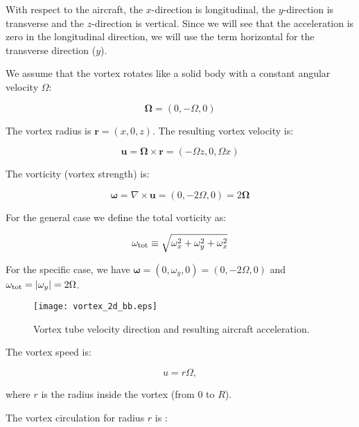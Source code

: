 \documentclass[smallextended]{svjour3}       %
\begin{document}
With respect to the aircraft, the $x$-direction is longitudinal, the $y$-direction is transverse and the $z$-direction is vertical. Since we will see that the acceleration is zero in the longitudinal direction, we will use the term horizontal for the transverse direction ($y$).

We assume that the vortex rotates like a solid body with a constant angular velocity $\Omega$:

\begin{equation}
\boldsymbol\Omega=\left( 0,-\Omega,0\right)
\end{equation}

The vortex radius is $\boldsymbol r=\left( x,0,z\right)$. The resulting vortex velocity is:

\begin{equation}
\boldsymbol u=\boldsymbol\Omega \times \boldsymbol r=\left(-\Omega z,0,\Omega x\right)
\end{equation}

The vorticity (vortex strength) is:

\begin{equation}
\boldsymbol\omega=\nabla \times \boldsymbol u=\left( 0,-2\Omega,0\right)=2 \boldsymbol\Omega
\end{equation}

For the general case we define the total vorticity as:

\begin{equation}
\omega_{\rm tot} \equiv \sqrt{\omega_x^2 + \omega_y^2 + \omega_x^2}
\end{equation}

For the specific case, we have $\boldsymbol\omega=\left(0,\omega_y,0 \right)=\left( 0,-2\Omega,0\right)$ and $\omega_{\rm tot}=|\omega_y|=2\Omega$.

\begin{figure}
\texttt{[image: vortex\_2d\_bb.eps]}
\caption{Vortex tube velocity direction and resulting aircraft acceleration.}
\label{fig:aircraft_acc}
\end{figure}

The vortex speed is:

\begin{equation}
u=r\Omega,
\end{equation}

\noindent where $r$ is the radius inside the vortex (from 0 to $R$).

The vortex circulation for radius $r$ is \citep{gerz_a}:
\end{document}
